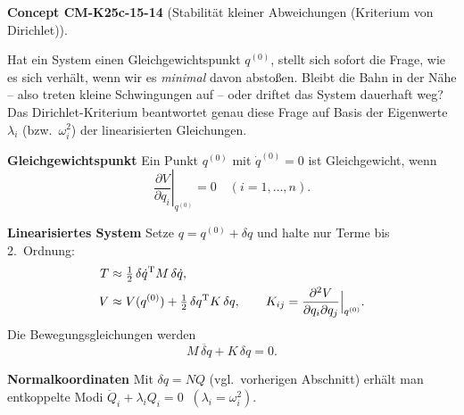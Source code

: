 \documentclass[10pt, letterpaper]{article}
\newcommand{\CustomHeading}[3]{%
  \par\medskip\noindent%
  \textbf{#1 #2} \textnormal{(#3)}.\enskip%
}
\newenvironment{CONC}[2]{\CustomHeading{Concept}{#1}{#2}}{}
\begin{document}
\begin{CONC}{CM-K25c-15-14}{Stabilität kleiner Abweichungen (Kriterium von Dirichlet)}
Hat ein System einen Gleichgewichtspunkt $q^{(0)}$, stellt sich sofort
die Frage, wie es sich verhält, wenn wir es \emph{minimal} davon
abstoßen.  Bleibt die Bahn in der Nähe – also treten kleine Schwingungen
auf – oder driftet das System dauerhaft weg?
Das Dirichlet-Kriterium beantwortet genau diese Frage auf Basis der
Eigenwerte $\lambda_i$ (bzw.\ $\omega_i^2$) der linearisierten
Gleichungen.

\textbf{Gleichgewichtspunkt}
Ein Punkt $q^{(0)}$ mit $\dot q^{(0)}=0$ ist Gleichgewicht, wenn  
\[
  \left.\frac{\partial V}{\partial q_i}\right|_{q^{(0)}} = 0
  \quad (i=1,\dots,n).
\]

\textbf{Linearisiertes System}
Setze $q=q^{(0)}+\delta q$ und halte nur Terme bis 2.\ Ordnung:
\begin{align*}
  T &\approx \tfrac12 \,\delta\dot q^{\mathrm T}M\,\delta\dot q, \\
  V &\approx V(q^{(0)})
        + \tfrac12 \,\delta q^{\mathrm T}K\,\delta q,
        \qquad
        K_{ij}= \Bigl.\frac{\partial^2V}{\partial q_i\partial q_j}
                 \Bigr|_{q^{(0)}} .
\end{align*}
Die Bewegungsgleichungen werden
\[
  M\,\ddot{\delta q}+K\,\delta q = 0.
\]

\textbf{Normalkoordinaten}
Mit $\delta q = N Q$ (vgl.\ vorherigen Abschnitt) erhält man
entkoppelte Modi
\(
  \ddot Q_i + \lambda_i Q_i = 0
  \;\;(\lambda_i = \omega_i^2).
\)
\end{CONC}
\end{document}
